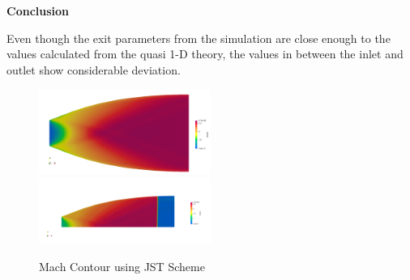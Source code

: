 \begin{flushleft}
\textbf{Conclusion}
\end{flushleft}
\vspace{-5}
Even though the exit parameters from the simulation are close enough to the values calculated from the quasi 1-D theory, the values in between the inlet and outlet show considerable deviation. \\
\begin{figure}[H]
    \includegraphics[width=0.5\textwidth]{text/Coarse_JST_Mach.png}
    \includegraphics[width=0.5\textwidth]{text/NS_Loc.png}
    \caption[Mach Contour of flow through nozzle]{Mach Contour using JST Scheme}
    \label{fig:Mach Contour using JST Scheme}
\end{figure}

\newpage
